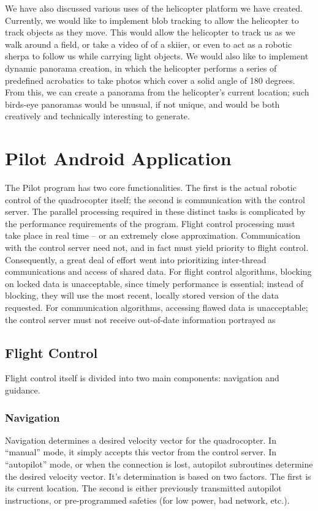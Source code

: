 \documentclass[letterpaper]{article}
\begin{document}
We have also discussed various uses of the helicopter platform we have
created. Currently, we would like to implement blob tracking to allow
the helicopter to track objects as they move. This would allow the
helicopter to track us as we walk around a field, or take a video of
of a skiier, or even to act as a robotic sherpa to follow us while
carrying light objects. We would also like to implement dynamic
panorama creation, in which the helicopter performs a series of
predefined acrobatics to take photos which cover a solid angle of 180
degrees. From this, we can create a panorama from the helicopter's
current location; such birds-eye panoramas would be unusual, if not
unique, and would be both creatively and technically interesting to
generate.

\section{Pilot Android Application}
\label{sec:pilot}
The Pilot program has two core functionalities.‭ ‬The first is the
actual robotic control of the quadrocopter itself‭; ‬the second is
communication with the control server.‭ ‬The parallel processing
required in these distinct tasks is complicated by the performance
requirements of the program.‭ ‬Flight control processing must take place
in real time -- or an extremely close approximation.‭ ‬Communication with
the control server need not,‭ ‬and in fact must yield priority to flight
control.‭ ‬Consequently,‭ ‬a great deal of effort went into prioritizing
inter-thread communications and access of shared data.‭ ‬For flight
control algorithms,‭ ‬blocking on locked data is unacceptable,‭ ‬since
timely performance is essential‭; ‬instead of blocking,‭ ‬they will use
the most recent,‭ ‬locally stored version of the data requested.‭ ‬For
communication algorithms,‭ ‬accessing flawed data is unacceptable‭; ‬the
control server must not receive out-of-date information portrayed as

\subsection{Flight Control}
Flight control itself is divided into two main components:‭ ‬navigation and guidance.
	
\subsubsection{Navigation}
Navigation determines a desired velocity vector for the quadrocopter.‭
‬In‭ “‬manual‭” ‬mode,‭ ‬it simply accepts this vector from the control
server.‭ ‬In‭ “‬autopilot‭” ‬mode,‭ ‬or when the connection is lost,‭ ‬autopilot
subroutines determine the desired velocity vector.‭ ‬It's determination
is based on two factors.‭ ‬The first is its current location.‭ ‬The second
is either previously transmitted autopilot instructions,‭ ‬or
pre-programmed safeties‭ (‬for low power,‭ ‬bad network,‭ ‬etc.‭).
\end{document}
